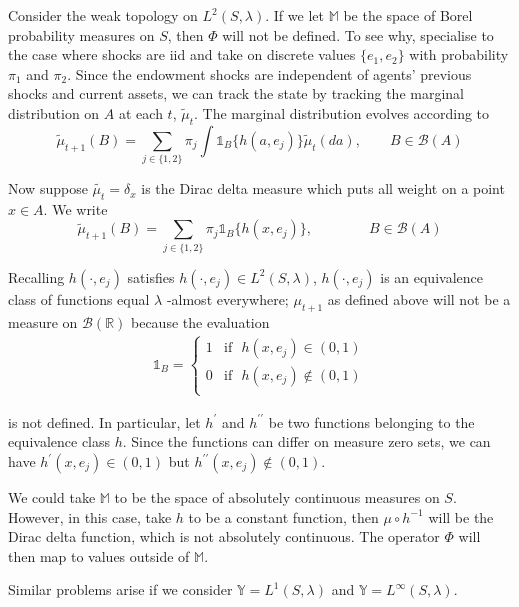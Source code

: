 \documentclass[12pt]{ectaart}
\newcommand{\1}{\mathbbm 1}
\theoremstyle{plain}
\theoremstyle{definition}
\begin{document}
	Consider the weak topology on $L^{2}(S,\lambda)$. If we let $\mathbb{M}$ be the space of Borel probability measures on $S$, then $\Phi$ will not be defined. To see why, specialise to the case where shocks are {\sc iid} and take on discrete values $\{e_{1},e_{2}\}$ with probability $\pi_{1}$ and $\pi_{2}$. Since the endowment shocks are independent of agents' previous shocks and current assets, we can track the state by tracking the marginal distribution on $A$ at each $t$, $\tilde{\mu}_{t}$. The marginal distribution evolves according to
	\begin{equation*}
	\tilde{\mu}_{t+1}(B) = \sum _{j\in \{1,2\}}\pi_{j}\int \mathbb{1}_{B}\{h(a, e_{j})\} \tilde{\mu}_{t}(da), \qquad B\in \mathscr{B}(A)
	\end{equation*}
	
	Now suppose $\tilde{\mu_{t}} = \delta_{x}$ is the Dirac delta measure which puts all weight on a point $x\in A$. We write 
	\[
	\tilde{\mu}_{t+1}(B) = \sum _{j\in \{1,2\}}\pi_{j} \mathbb{1}_{B}\{h(x, e_{j})\}, \qquad\qquad B\in \mathscr{B}(A)\]
	
	Recalling  $h(\cdot,e_{j})$ satisfies $h(\cdot,e_{j})\in L^{2}(S,\lambda)$,  $h(\cdot,e_{j})$ is an equivalence class of functions equal $\lambda$ -almost everywhere; $\mu_{t+1}$ as defined above will not be a measure on $\mathscr{B}(\mathbb{R})$ because the evaluation
	\begin{align*}
	\mathbb{1}_{B} = 
	\begin{cases}
		 1 &  \text{if}\,\,\,\, h(x,e_{j})\in (0,1)\\
		0&  \text{if}\,\,\,\, h(x,e_{j})\not\in (0,1)\\
	\end{cases}
	\end{align*}
	
	is not defined. In particular, let $h^{\prime}$ and $h^{\prime\prime}$ be two functions belonging to the equivalence class $h$. Since the functions can differ on measure zero sets, we can have $h^{\prime}(x,e_{j})\in (0,1)$ but $h^{\prime\prime}(x,e_{j})\not\in (0,1)$.
	
	
	We could take $\mathbb{M}$ to be the space of absolutely continuous measures on $S$. However, in this case, take $h$ to be a constant function, then $\mu\circ h^{-1}$ will be the Dirac delta function, which is not absolutely continuous. The operator $\Phi$ will then map to values outside of $\mathbb{M}$.
	
	Similar problems arise if we consider $\mathbb{Y} = L^{1}(S, \lambda)$ and $\mathbb{Y} = L^{\infty}(S, \lambda)$. 
	
\end{document}
